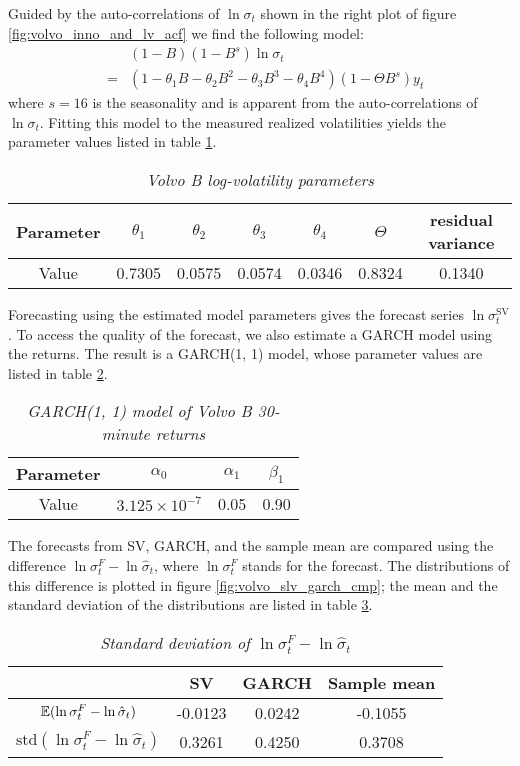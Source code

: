 Guided by the auto-correlations of $\ln\sigma_t$ shown in the right
plot of figure \ref{fig:volvo_inno_and_lv_acf} we find the following
model:
\begin{eqnarray}
  && (1 - B)(1 - B^s) \ln \sigma_t \nonumber \\
  &=& (1 - \theta_1 B - \theta_2B^2 -
  \theta_3B^3 - \theta_4B^4) (1 - \Theta B^s)
  y_t \label{eq:volvo_lv_model}
\end{eqnarray}
where $s = 16$ is the seasonality and is apparent from the
auto-correlations of $\ln\sigma_t$. Fitting this model to the
measured realized volatilities yields the parameter values listed in
table
\ref{tab:volvo_params}.
\begin{table}[htb!]
  \centering
  \begin{tabular}{|c|c|c|c|c|c|c|}
    \hline
    Parameter & $\theta_1$ & $\theta_2$ & $\theta_3$ & $\theta_4$ &
    $\Theta$ & residual variance \\
    \hline
    Value & 0.7305 & 0.0575 & 0.0574 & 0.0346 & 0.8324 & 0.1340\\
    \hline
  \end{tabular}
  \caption{\small \it Volvo B log-volatility parameters}
  \label{tab:volvo_params}
\end{table}
Forecasting using the estimated model parameters gives the forecast
series $\ln \sigma^{\text{SV}}_t$. To access the quality of the
forecast, we also estimate a GARCH model using the returns. The result
is a GARCH(1, 1) model, whose parameter values are listed in table
\ref{tab:volvo_garch}.
\begin{table}[htb!]
  \centering
  \begin{tabular}{|c|c|c|c|}
    \hline
    Parameter & $\alpha_0$ & $\alpha_1$  & $\beta_1$ \\
    \hline
    Value & $3.125 \times 10^{-7}$ & 0.05 & 0.90 \\
    \hline
  \end{tabular}
  \caption{\small \it GARCH(1, 1) model of Volvo B 30-minute returns}
  \label{tab:volvo_garch}
\end{table}

The forecasts from SV, GARCH, and the sample mean are compared
using the difference $\ln \sigma^F_t - \ln\hat{\sigma}_t$, where $\ln
\sigma^F_t$ stands for the forecast. The distributions of this
difference is plotted in figure \ref{fig:volvo_slv_garch_cmp}; the
mean and the standard deviation of the distributions are listed in
table \ref{tab:volvo_slv_garch_cmp}.
\begin{table}[htb!]
  \centering
  \begin{tabular}{|c|c|c|c|}
    \hline
    & SV & GARCH & Sample mean \\
    \hline
    $\mathbb{E}(\ln \sigma^F_t - \ln \hat{\sigma}_t)$ & -0.0123 &
    0.0242 & -0.1055 \\
    \hline
    $\text{std}(\ln \sigma^F_t - \ln \hat{\sigma}_t)$ & 0.3261 &
    0.4250 & 0.3708 \\
    \hline
  \end{tabular}
  \caption{\small \it Standard deviation of $\ln\sigma^F_t -
    \ln\hat{\sigma}_t$}
  \label{tab:volvo_slv_garch_cmp}
\end{table}

